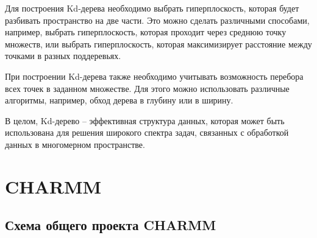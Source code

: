Для построения Kd-дерева необходимо выбрать гиперплоскость, которая будет разбивать пространство на две части. Это можно сделать различными способами, например, выбрать гиперплоскость, которая проходит через среднюю точку множеств, или выбрать гиперплоскость, которая максимизирует расстояние между точками в разных поддеревьях.

При построении Kd-дерева также необходимо учитывать возможность перебора всех точек в заданном множестве. Для этого можно использовать различные алгоритмы, например, обход дерева в глубину или в ширину.

В целом, Kd-дерево -- эффективная структура данных, которая может быть использована для решения широкого спектра задач, связанных с обработкой данных в многомерном пространстве.

\section{CHARMM}

\subsection{Схема общего проекта CHARMM}

